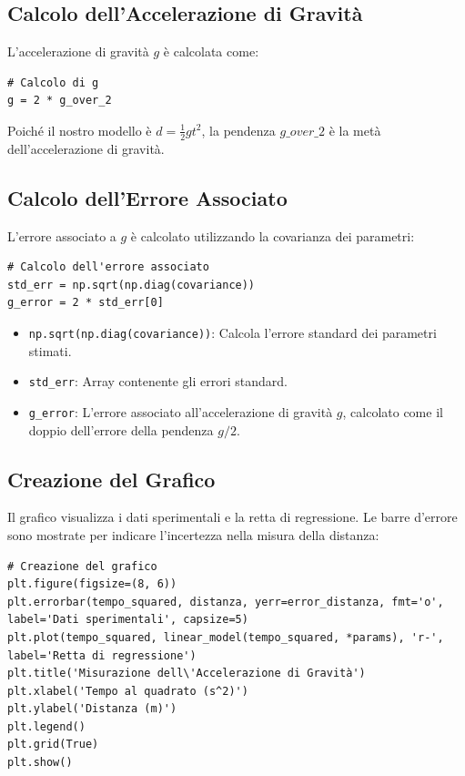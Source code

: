 \documentclass[a4paper,12pt]{article}
\begin{document}
\subsection{Calcolo dell'Accelerazione di Gravità}
L'accelerazione di gravità \( g \) è calcolata come:

\begin{lstlisting}
# Calcolo di g
g = 2 * g_over_2
\end{lstlisting}

Poiché il nostro modello è \( d = \frac{1}{2} g t^2 \), la pendenza \( g\_over\_2 \) è la metà dell'accelerazione di gravità.

\subsection{Calcolo dell'Errore Associato}
L'errore associato a \( g \) è calcolato utilizzando la covarianza dei parametri:

\begin{lstlisting}
# Calcolo dell'errore associato
std_err = np.sqrt(np.diag(covariance))
g_error = 2 * std_err[0]

\end{lstlisting}

\begin{itemize}
    \item \texttt{np.sqrt(np.diag(covariance))}: Calcola l'errore standard dei parametri stimati.
    \item \texttt{std\_err}: Array contenente gli errori standard.
    \item \texttt{g\_error}: L'errore associato all'accelerazione di gravità \( g \), calcolato come il doppio dell'errore della pendenza \( g/2 \).
\end{itemize}

\subsection{Creazione del Grafico}
Il grafico visualizza i dati sperimentali e la retta di regressione. Le barre d'errore sono mostrate per indicare l'incertezza nella misura della distanza:

\begin{lstlisting}
# Creazione del grafico
plt.figure(figsize=(8, 6))
plt.errorbar(tempo_squared, distanza, yerr=error_distanza, fmt='o', label='Dati sperimentali', capsize=5)
plt.plot(tempo_squared, linear_model(tempo_squared, *params), 'r-', label='Retta di regressione')
plt.title('Misurazione dell\'Accelerazione di Gravità')
plt.xlabel('Tempo al quadrato (s^2)')
plt.ylabel('Distanza (m)')
plt.legend()
plt.grid(True)
plt.show()
\end{lstlisting}
\end{document}
